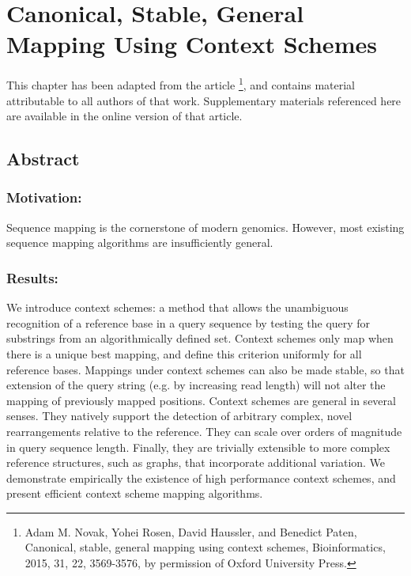 \setlength{\textfloatsep}{1pt plus 1.0pt}

\newtheorem{theorem}{Theorem}
\newtheorem{lemma}{Lemma}

\chapter{Canonical, Stable, General Mapping Using Context Schemes}
\label{ch:contextschemes}

This chapter has been adapted from the article \citet{novak2015canonical}\footnote{Adam M. Novak, Yohei Rosen, David Haussler, and Benedict Paten,
Canonical, stable, general mapping using context schemes,
Bioinformatics,
2015,
31, 
22,
3569-3576,
by permission of Oxford University Press.}, and contains material attributable to all authors of that work. Supplementary materials referenced here are available in the online version of that article.

\section{Abstract}
\subsection{Motivation:}
Sequence mapping is the cornerstone of modern genomics. However, most existing sequence mapping algorithms are insufficiently general.

\subsection{Results:}
We introduce context schemes: a method that allows the unambiguous recognition of a reference base in a query sequence by testing the query for substrings from an algorithmically defined set. Context schemes only map when there is a unique best mapping, and define this criterion uniformly for all reference bases. Mappings under context schemes can also be made stable, so that extension of the query string (e.g. by increasing read length) will not alter the mapping of previously mapped positions. Context schemes are general in several senses. They natively support the detection of arbitrary complex, novel rearrangements relative to the reference. They can scale over orders of magnitude in query sequence length. Finally, they are trivially extensible to more complex reference structures, such as graphs, that incorporate additional variation.
We demonstrate empirically the existence of high performance context schemes, and present efficient context scheme mapping algorithms.

